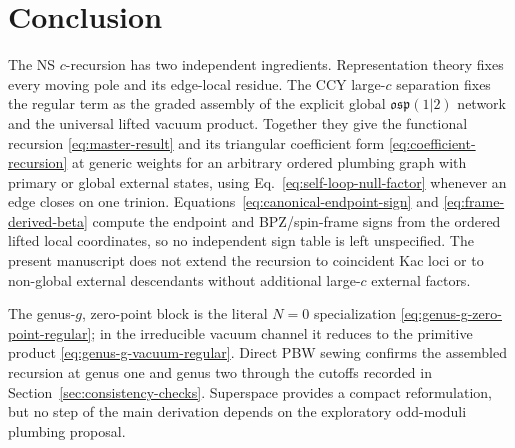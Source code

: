 \documentclass[11pt]{article}
\newcommand{\osp}{\mathfrak{osp}(1|2)}
\begin{document}
\section*{Conclusion}

The NS \(c\)-recursion has two independent ingredients.  Representation
theory fixes every moving pole and its edge-local residue.  The CCY
large-\(c\) separation fixes the regular term as the graded assembly of the
explicit global \(\osp\) network and the universal lifted vacuum product.
Together they give the functional recursion
\eqref{eq:master-result} and its triangular coefficient form
\eqref{eq:coefficient-recursion} at generic weights for an arbitrary ordered
plumbing graph with primary or global external states, using
Eq.~\eqref{eq:self-loop-null-factor} whenever an edge closes on one trinion.
Equations~\eqref{eq:canonical-endpoint-sign} and
\eqref{eq:frame-derived-beta} compute the endpoint and BPZ/spin-frame signs
from the ordered lifted local coordinates, so no independent sign table is
left unspecified.  The present manuscript does not extend the recursion to
coincident Kac loci or to non-global external descendants without additional
large-\(c\) external factors.

The genus-\(g\), zero-point block is the literal \(N=0\) specialization
\eqref{eq:genus-g-zero-point-regular}; in the irreducible vacuum channel it
reduces to the primitive product \eqref{eq:genus-g-vacuum-regular}.  Direct
PBW sewing confirms the assembled recursion at genus one and genus two
through the cutoffs recorded in Section~\ref{sec:consistency-checks}.
Superspace provides a compact reformulation, but no step of the main
derivation depends on the exploratory odd-moduli plumbing proposal.



\end{document}
